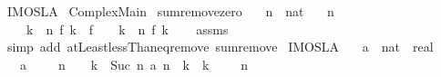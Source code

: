 %
\begin{isabellebody}%
%
%
\isadelimdocument
%
\endisadelimdocument
%
\isatagdocument
%
\isamarkuptrue%
%
\isamarkuptrue%
%
\endisatagdocument
{\isafolddocument}%
%
\isadelimdocument
%
\endisadelimdocument
%
\isadelimtheory
%
\endisadelimtheory
%
\isatagtheory
{}\isamarkupfalse%
\ IMO{\isacharunderscore}{}{}{}{}{\isacharunderscore}SL{\isacharunderscore}A{}\isanewline
{}\ Complex{\isacharunderscore}Main\isanewline
{}%
\endisatagtheory
{\isafoldtheory}%
%
\isadelimtheory
\isanewline
%
\endisadelimtheory
\isanewline
{}\isamarkupfalse%
\ sum{\isacharunderscore}remove{\isacharunderscore}zero{\isacharcolon}\isanewline
\ \ \ n\ {\isacharcolon}{\isacharcolon}\ nat\isanewline
\ \ \ {\isachardoublequoteopen}n\ {\isachargreater}\ {}{\isachardoublequoteclose}\isanewline
\ \ \ {\isachardoublequoteopen}{\isacharparenleft}{\isasymSum}\ k\ {\isacharless}\ n{\isachardot}\ f\ k{\isacharparenright}\ {\isacharequal}\ f\ {}\ {\isacharplus}\ {\isacharparenleft}{\isasymSum}\ k\ {\isasymin}\ {\isacharbraceleft}{}{\isachardot}{\isachardot}{\isacharless}n{\isacharbraceright}{\isachardot}\ f\ k{\isacharparenright}{\isachardoublequoteclose}\isanewline
%
\isadelimproof
\ \ %
\endisadelimproof
%
\isatagproof
{}\isamarkupfalse%
\ assms\isanewline
\ \ \isamarkupfalse%
\ {\isacharparenleft}simp\ add{\isacharcolon}\ atLeast{}{\isacharunderscore}lessThan{\isacharunderscore}eq{\isacharunderscore}remove{}\ sum{\isachardot}remove{\isacharparenright}%
\endisatagproof
{\isafoldproof}%
%
\isadelimproof
\isanewline
%
\endisadelimproof
\isanewline
{}\isamarkupfalse%
\ IMO{\isacharunderscore}{}{}{}{}{\isacharunderscore}SL{\isacharunderscore}A{}{\isacharcolon}\isanewline
\ \ \ a\ {\isacharcolon}{\isacharcolon}\ {\isachardoublequoteopen}nat\ {\isasymRightarrow}\ real{\isachardoublequoteclose}\isanewline
\ \ \ {\isachardoublequoteopen}a\ {}\ {\isacharequal}\ {\isacharminus}{}{\isachardoublequoteclose}\ {\isachardoublequoteopen}{\isasymforall}\ n\ {\isasymge}\ {}{\isachardot}\ {\isacharparenleft}{\isasymSum}\ k\ {\isacharless}\ Suc\ n{\isachardot}\ a\ {\isacharparenleft}n\ {\isacharminus}\ k{\isacharparenright}\ {\isacharslash}\ {\isacharparenleft}k\ {\isacharplus}\ {}{\isacharparenright}{\isacharparenright}\ {\isacharequal}\ {}{\isachardoublequoteclose}\ {\isachardoublequoteopen}n\ {\isasymge}\ {}{\isachardoublequoteclose}\isanewline

\end{isabellebody}
